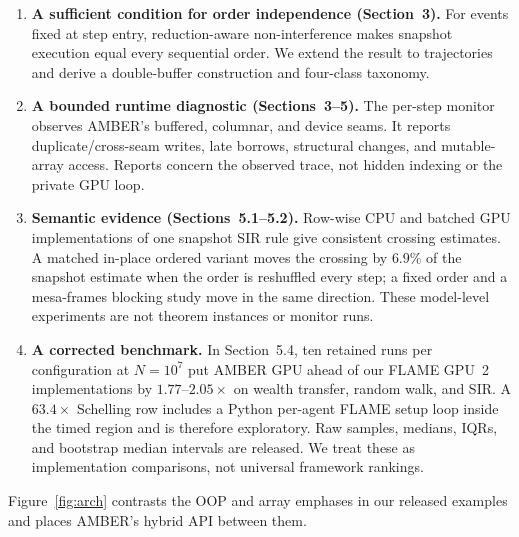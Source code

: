 \documentclass[sigconf,nonacm,review,natbib=true]{acmart}
\theoremstyle{definition}
\theoremstyle{plain}
\theoremstyle{remark}
\begin{document}
\begin{enumerate}
\item \textbf{A sufficient condition for order independence (Section~3).}
For events fixed at step entry, reduction-aware non-interference makes snapshot
execution equal every sequential order. We extend the result to trajectories
and derive a double-buffer construction and four-class taxonomy.

\item \textbf{A bounded runtime diagnostic (Sections~3--5).} The per-step
monitor observes AMBER's buffered, columnar, and device seams. It reports
duplicate/cross-seam writes, late borrows, structural changes, and mutable-array
access. Reports concern the observed trace, not hidden indexing or the private
GPU loop.

\item \textbf{Semantic evidence (Sections~5.1--5.2).} Row-wise CPU
and batched GPU implementations of one snapshot SIR rule give consistent
crossing estimates. A matched in-place ordered variant moves the crossing by
$6.9\%$ of the snapshot estimate when the order is reshuffled every step; a
fixed order and a mesa-frames blocking study move in the
same direction. These model-level experiments are not theorem instances or
monitor runs.

\item \textbf{A corrected benchmark.} In Section~5.4, ten retained runs per
configuration at $N{=}10^7$ put AMBER GPU ahead of our FLAME GPU~2
implementations by $1.77$--$2.05\times$ on wealth transfer, random walk, and
SIR. A $63.4\times$ Schelling row includes a Python per-agent FLAME setup loop
inside the timed region and is therefore exploratory. Raw samples, medians,
IQRs, and bootstrap median intervals are released. We treat these as
implementation comparisons, not universal framework rankings.
\end{enumerate}

Figure~\ref{fig:arch} contrasts the OOP and array emphases in our released
examples and places AMBER's hybrid API between them.
\end{document}
